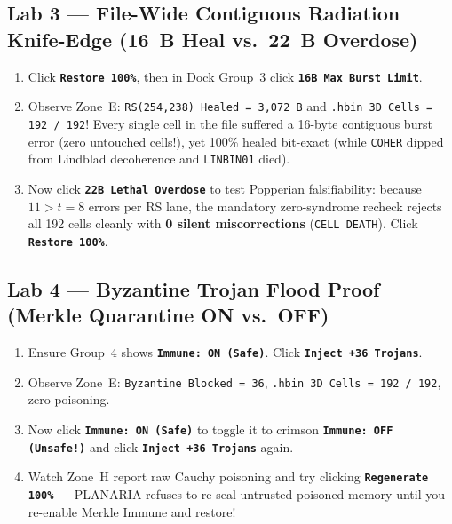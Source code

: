 \documentclass[10pt,letterpaper]{article}
\begin{document}
\subsection{Lab 3 --- File-Wide Contiguous Radiation Knife-Edge (16~B Heal vs.\ 22~B Overdose)}
\begin{enumerate}[leftmargin=1.6em, itemsep=1.5pt]
  \item Click \textbf{\texttt{Restore 100\%}}, then in Dock Group~3 click \textbf{\texttt{16B Max Burst Limit}}.
  \item Observe Zone~E: \texttt{RS(254,238) Healed = 3,072 B} and \texttt{.hbin 3D Cells = 192 / 192}! Every single cell in the file suffered a 16-byte contiguous burst error (zero untouched cells!), yet 100\% healed bit-exact (while \texttt{COHER} dipped from Lindblad decoherence and \texttt{LINBIN01} died).
  \item Now click \textbf{\texttt{22B Lethal Overdose}} to test Popperian falsifiability: because $11 > t = 8$ errors per RS lane, the mandatory zero-syndrome recheck rejects all 192 cells cleanly with \textbf{0 silent miscorrections} (\texttt{CELL DEATH}). Click \textbf{\texttt{Restore 100\%}}.
\end{enumerate}

\subsection{Lab 4 --- Byzantine Trojan Flood Proof (Merkle Quarantine ON vs.\ OFF)}
\begin{enumerate}[leftmargin=1.6em, itemsep=1.5pt]
  \item Ensure Group~4 shows \textbf{\texttt{Immune: ON (Safe)}}. Click \textbf{\texttt{Inject +36 Trojans}}.
  \item Observe Zone~E: \texttt{Byzantine Blocked = 36}, \texttt{.hbin 3D Cells = 192 / 192}, zero poisoning.
  \item Now click \textbf{\texttt{Immune: ON (Safe)}} to toggle it to crimson \textbf{\texttt{Immune: OFF (Unsafe!)}} and click \textbf{\texttt{Inject +36 Trojans}} again.
  \item Watch Zone~H report raw Cauchy poisoning and try clicking \textbf{\texttt{Regenerate 100\%}} --- PLANARIA refuses to re-seal untrusted poisoned memory until you re-enable Merkle Immune and restore!
\end{enumerate}
\end{document}
